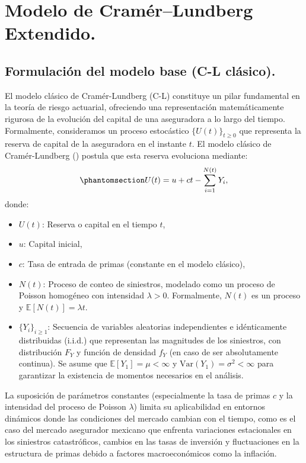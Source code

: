 \documentclass[
  spanish,
  us-letterpaper,
]{scrreprt}
\theoremstyle{plain}
\theoremstyle{plain}
\theoremstyle{definition}
\theoremstyle{remark}
\begin{document}
\section{Modelo de Cramér--Lundberg
Extendido.}\label{modelo-de-cramuxe9rlundberg-extendido.}

\subsection{Formulación del modelo base (C-L
clásico).}\label{formulaciuxf3n-del-modelo-base-c-l-cluxe1sico.}

El modelo clásico de Cramér-Lundberg (C-L) constituye un pilar
fundamental en la teoría de riesgo actuarial, ofreciendo una
representación matemáticamente rigurosa de la evolución del capital de
una aseguradora a lo largo del tiempo. Formalmente, consideramos un
proceso estocástico \(\{U(t)\}_{t \geq 0}\) que representa la reserva de
capital de la aseguradora en el instante \(t\). El modelo clásico de
Cramér-Lundberg (\textcite{Lundberg1903}) postula que esta reserva
evoluciona mediante:
\begin{equation}\protect\phantomsection\label{eq-8}{U(t) = u + ct - \sum_{i=1}^{N(t)} Y_i,}\end{equation}
donde:

\begin{itemize}
\item
  \(U(t)\): Reserva o capital en el tiempo \(t\),
\item
  \(u\): Capital inicial,
\item
  \(c\): Tasa de entrada de primas (constante en el modelo clásico),
\item
  \(N(t)\): Proceso de conteo de siniestros, modelado como un proceso de
  Poisson homogéneo con intensidad \(\lambda > 0\). Formalmente,
  \(N(t)\) es un proceso y \(\mathbb{E}[N(t)] = \lambda t\).
\item
  \(\{Y_i\}_{i \geq 1}\): Secuencia de variables aleatorias
  independientes e idénticamente distribuidas (i.i.d.) que representan
  las magnitudes de los siniestros, con distribución \(F_Y\) y función
  de densidad \(f_Y\) (en caso de ser absolutamente continua). Se asume
  que \(\mathbb{E}[Y_1] = \mu < \infty\) y
  \(\text{Var}(Y_1) = \sigma^2 < \infty\) para garantizar la existencia
  de momentos necesarios en el análisis.
\end{itemize}

La suposición de parámetros constantes (especialmente la tasa de primas
\(c\) y la intensidad del proceso de Poisson \(\lambda\)) limita su
aplicabilidad en entornos dinámicos donde las condiciones del mercado
cambian con el tiempo, como es el caso del mercado asegurador mexicano
que enfrenta variaciones estacionales en los siniestros catastróficos,
cambios en las tasas de inversión y fluctuaciones en la estructura de
primas debido a factores macroeconómicos como la inflación.
\end{document}
